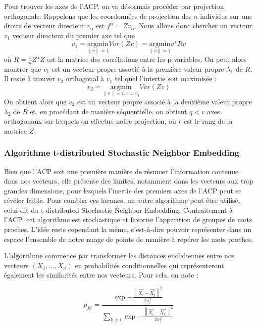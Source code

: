 \documentclass[11pt,french,french]{article}
\begin{document}
Pour trouver les axes de l'ACP, on va désormais procéder par projection
orthogonale. Rappelons que les coordonnées de projection des \(n\)
individus sur une droite de vecteur directeur \(v_\alpha\) est
\(f^\alpha = Zv_\alpha\). Nous allons donc chercher un vecteur \(v_1\)
vecteur directeur du premier axe tel que
\[v_1 =\underset{ \left\| v  \right\| = 1}{\mathrm{argmin}} Var(Zv) =\underset{ \left\| v  \right\| = 1}{\mathrm{argmin}} v\,^t R v \]
où \(R = \frac{1}{n} Z\,^t Z\) est la matrice des corrélations entre les
p variables. On peut alors montrer que \(v_1\) est un vecteur propre
associé à la première valeur propre \(\lambda_1\) de \(R\). Il reste à
trouver \(v_2\) orthogonal à \(v_1\) tel quel l'intertie soit maximisée
:
\[v_2 =\underset{ \left\| v  \right\| = 1, v \perp v_1}{\mathrm{argmin}} Var(Zv) \]
On obtient alors que \(v_2\) est un vecteur propre associé à la deuxième
valeur propre \(\lambda_2\) de \(R\) et, en procédant de manière
séquentielle, on obtient \(q < r\) axes orthogonaux sur lesquels on
effectue notre projection, où \(r\) est le rang de la matrice \(Z\).

\subsubsection{Algorithme t-distributed Stochastic Neighbor
Embedding}\label{algorithme-t-distributed-stochastic-neighbor-embedding}

Bien que l'ACP soit une première manière de résumer l'information
contenue dans nos vecteurs, elle présente des limites, notamment dans
les vecteurs aux trop grandes dimensions, pour lesquels l'inertie des
premiers axes de l'ACP peut se révéler faible. Pour combler ces lacunes,
un autre algorithme peut être utilisé, celui dit du t-distributed
Stochastic Neighbor Embedding. Contraitement à l'ACP, cet algorithme est
stochastique et favorise l'apparition de groupes de mots proches. L'idée
reste cependant la même, c'est-à-dire pouvoir représenter dans un espace
l'ensemble de notre nuage de points de manière à repérer les mots
proches.

L'algorithme commence par transformer les distances euclidiennes entre
nos vecteurs \((X_1,...,X_n)\) en probabilités conditionnelles qui
représenteront également les similarités entre nos vecteurs. Pour cela,
on note :

\[ p_{j|i} = \frac{\exp{-\frac{\left\| \vec{X_i} - \vec{X_j}  \right\|^2}{2\sigma_i^2}}}{\sum_{k \neq i}{\exp{-\frac{\left\| \vec{X_i} - \vec{X_k}  \right\|^2}{2\sigma_i^2}}}}\]
\end{document}
